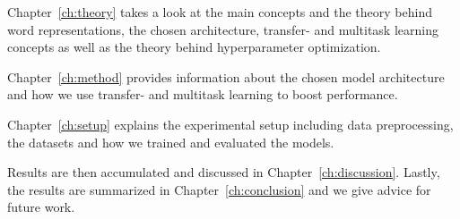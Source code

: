 Chapter~\ref{ch:theory} takes a look at the main concepts and the theory behind word representations, the chosen architecture, transfer- and multitask learning concepts as well as the theory behind hyperparameter optimization.
\smallskip

Chapter~\ref{ch:method} provides information about the chosen model architecture and how we use transfer- and multitask learning to boost performance.
\smallskip

Chapter~\ref{ch:setup} explains the experimental setup including data preprocessing, the datasets and how we trained and evaluated the models.
\smallskip

Results are then accumulated and discussed in Chapter~\ref{ch:discussion}. Lastly, the results are
summarized in Chapter~\ref{ch:conclusion} and we give advice for future work.